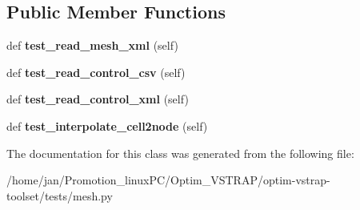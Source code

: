 \subsection*{Public Member Functions}
\begin{DoxyCompactItemize}
\item 
\mbox{\label{classmesh_1_1MeshTest_aadbea4688c34405d93e63a73744d3b49}} 
def {\bfseries test\+\_\+read\+\_\+mesh\+\_\+xml} (self)
\item 
\mbox{\label{classmesh_1_1MeshTest_a72429959940aca2333822a686964b29c}} 
def {\bfseries test\+\_\+read\+\_\+control\+\_\+csv} (self)
\item 
\mbox{\label{classmesh_1_1MeshTest_a409b1c2216946515c4c50bcfc4b9dee3}} 
def {\bfseries test\+\_\+read\+\_\+control\+\_\+xml} (self)
\item 
\mbox{\label{classmesh_1_1MeshTest_a38f39aaad1915bc5ebde163699ac7485}} 
def {\bfseries test\+\_\+interpolate\+\_\+cell2node} (self)
\end{DoxyCompactItemize}


The documentation for this class was generated from the following file\+:\begin{DoxyCompactItemize}
\item 
/home/jan/\+Promotion\+\_\+linux\+P\+C/\+Optim\+\_\+\+V\+S\+T\+R\+A\+P/optim-\/vstrap-\/toolset/tests/mesh.\+py\end{DoxyCompactItemize}
